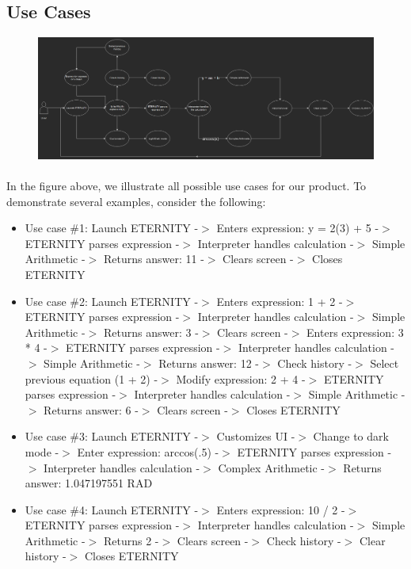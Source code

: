            \FloatBarrier

        \newpage
        \subsection{Use Cases}
            \begin{figure}[!htb]
                \centering
                \includegraphics[scale=0.5]{images/usecases.PNG}
            \end{figure}
            \paragraph{}
            In the figure above, we illustrate all possible use cases for our product. To demonstrate several examples, consider the following:
            \begin{itemize}
                \item Use case \#1: Launch ETERNITY -$>$ Enters expression: y = 2(3) + 5 -$>$ ETERNITY parses expression -$>$ Interpreter handles calculation -$>$ Simple Arithmetic -$>$ Returns answer: 11 -$>$ Clears screen -$>$ Closes ETERNITY
                \item Use case \#2: Launch ETERNITY -$>$ Enters expression: 1 + 2 -$>$ ETERNITY parses expression -$>$ Interpreter handles calculation -$>$ Simple Arithmetic -$>$ Returns answer: 3 -$>$ Clears screen -$>$ Enters expression: 3 * 4 -$>$ ETERNITY parses expression -$>$ Interpreter handles calculation -$>$ Simple Arithmetic -$>$ Returns answer: 12 -$>$ Check history -$>$ Select previous equation (1 + 2) -$>$ Modify expression: 2 + 4 -$>$ ETERNITY parses expression -$>$ Interpreter handles calculation -$>$ Simple Arithmetic -$>$ Returns answer: 6 -$>$ Clears screen -$>$ Closes ETERNITY
                \item Use case \#3: Launch ETERNITY -$>$ Customizes UI -$>$ Change to dark mode -$>$ Enter expression: arccos(.5) -$>$ ETERNITY parses expression -$>$ Interpreter handles calculation -$>$ Complex Arithmetic -$>$ Returns answer: 1.047197551 RAD
                \item Use case \#4: Launch ETERNITY -$>$ Enters expression: 10 / 2 -$>$ ETERNITY parses expression -$>$ Interpreter handles calculation -$>$ Simple Arithmetic -$>$ Returns 2 -$>$ Clears screen -$>$ Check history -$>$ Clear history -$>$ Closes ETERNITY
            \end{itemize}
            \FloatBarrier

